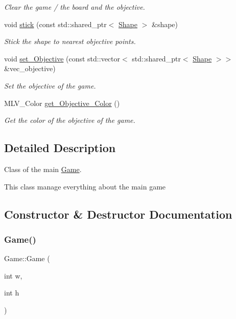 \begin{DoxyCompactItemize}
\begin{DoxyCompactList}\small\item\em Clear the game / the board and the objective. \end{DoxyCompactList}\item 
void \hyperlink{classGame_a54ea3746d3738423197219af2d508188}{stick} (const std\+::shared\+\_\+ptr$<$ \hyperlink{classShape}{Shape} $>$ \&shape)
\begin{DoxyCompactList}\small\item\em Stick the shape to nearest objective points. \end{DoxyCompactList}\item 
void \hyperlink{classGame_af8d3ef359625e4179d54f5dd956a0df5}{set\+\_\+\+Objective} (const std\+::vector$<$ std\+::shared\+\_\+ptr$<$ \hyperlink{classShape}{Shape} $>$$>$ \&vec\+\_\+objective)
\begin{DoxyCompactList}\small\item\em Set the objective of the game. \end{DoxyCompactList}\item 
M\+L\+V\+\_\+\+Color \hyperlink{classGame_ac5de4b11ae90a7ea9182621039fa511c}{get\+\_\+\+Objective\+\_\+\+Color} ()
\begin{DoxyCompactList}\small\item\em Get the color of the objective of the game. \end{DoxyCompactList}\end{DoxyCompactItemize}


\subsection{Detailed Description}
Class of the main \hyperlink{classGame}{Game}. 

This class manage everything about the main game 

\subsection{Constructor \& Destructor Documentation}
\mbox{\label{classGame_a2b0cb8af7b823a6d595eef9c9641f806}} 
\subsubsection{\texorpdfstring{Game()}{Game()}}
{\footnotesize\ttfamily Game\+::\+Game (\begin{DoxyParamCaption}\item[{int}]{w,  }\item[{int}]{h }\end{DoxyParamCaption})}



